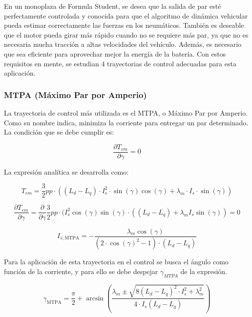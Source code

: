 En un monoplaza de Formula Student, se desea que la salida de par esté perfectamente controlada y conocida para que el algoritmo de dinámica vehicular pueda estimar correctamente las fuerzas en los neumáticos. También es deseable que el motor pueda girar más rápido cuando no se requiere más par, ya que no es necesaria mucha tracción a altas velocidades del vehículo. Además, es necesario que sea eficiente para aprovechar mejor la energía de la batería. Con estos requisitos en mente, se estudian 4 trayectorias de control adecuadas para esta aplicación.

\subsubsection{MTPA (Máximo Par por Amperio)}

La trayectoria de control más utilizada es el MTPA, o Máximo Par por Amperio. Como su nombre indica, minimiza la corriente para entregar un par determinado. La condición que se debe cumplir es:

\begin{equation}
	\frac{\partial T_{em}}{\partial \gamma} = 0
\end{equation}


La expresión analítica se desarrolla como:

\begin{equation}
	T_{em} = \frac{3}{2}pp\cdot((L_d - L_q)\cdot I_s^2 \cdot \sin(\gamma)\cos(\gamma) + \lambda_m\cdot I_s\cdot \sin(\gamma))
\end{equation}


\begin{equation}
\frac{\partial T_{em}}{\partial \gamma} = \frac{\partial}{\partial \gamma} \frac{3}{2}pp\cdot(I_s^2 \cos(\gamma)\sin(\gamma)\cdot((L_d - L_q) + \lambda_m I_s \sin(\gamma)) = 0
\end{equation}

\begin{equation}
I_{s,\text{MTPA}} = -\frac{\lambda_m \cos(\gamma)}{(2\cdot\cos(\gamma)^2 - 1)\cdot(L_d-L_q)}
\end{equation}

Para la aplicación de esta trayectoria en el control se busca el ángulo como función de la corriente, y para ello se debe despejar \(\gamma_{MTPA}\) de la expresión.

\begin{equation}
\gamma_{\text{MTPA}} = \frac{\pi}{2} + \arcsin(\frac{\lambda_m \pm \sqrt{8(L_d-L_q)^2 \cdot I_s^2 + \lambda_m^2}}{4\cdot I_s(L_d-L_q)})
\end{equation}

